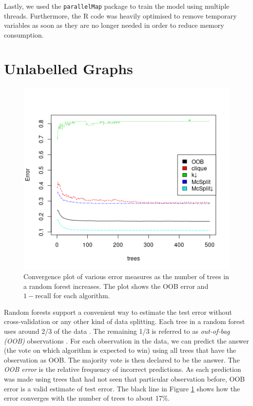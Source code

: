 \documentclass{l4proj}
\theoremstyle{definition}
\theoremstyle{remark}
\begin{document}
Lastly, we used the \texttt{parallelMap} package to train the model using
multiple threads. Furthermore, the R code was heavily optimised to remove
temporary variables as soon as they are no longer needed in order to reduce
memory consumption.

\section{Unlabelled Graphs}

\begin{figure}
  \centering
  \includegraphics[scale=0.7]{images/unlabelled_forest_errors.png}
  \caption{Convergence plot of various error measures as the number of trees in
    a random forest increases. The plot shows the OOB error and $1 -
    \text{recall}$ for each algorithm.}
  \label{fig:unlabelled_forest_errors}
\end{figure}

Random forests support a convenient way to estimate the test error without
cross-validation or any other kind of data splitting. Each tree in a random
forest uses around 2/3 of the data \cite{James:2014:ISL:2517747}. The remaining
1/3 is referred to as \emph{out-of-bag (OOB)} observations . For each
observation in the data, we can predict the answer (the vote on which algorithm
is expected to win) using all trees that have the observation as OOB. The
majority vote is then declared to be the answer. The \emph{OOB error} is
the relative frequency of incorrect predictions. As each prediction was made
using trees that had not seen that particular observation before, OOB error is a
valid estimate of test error. The black line in Figure
\ref{fig:unlabelled_forest_errors} shows how the error converges with the number
of trees to about 17\%.
\end{document}
